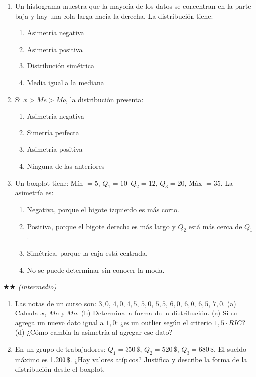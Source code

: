 \documentclass[11pt, letterpaper]{article}
\begin{document}
\begin{enumerate}[label=\textbf{\arabic*.}, leftmargin=*]
  \item Un histograma muestra que la mayoría de los datos se concentran en la parte baja y hay una cola larga hacia la derecha. La distribución tiene:
  \begin{enumerate}[label=\Alph*),leftmargin=14pt]
    \item Asimetría negativa
    \item Asimetría positiva
    \item Distribución simétrica
    \item Media igual a la mediana
  \end{enumerate}

  \item Si $\bar{x} > Me > Mo$, la distribución presenta:
  \begin{enumerate}[label=\Alph*),leftmargin=14pt]
    \item Asimetría negativa
    \item Simetría perfecta
    \item Asimetría positiva
    \item Ninguna de las anteriores
  \end{enumerate}

  \item Un boxplot tiene: Mín $= 5$, $Q_1 = 10$, $Q_2 = 12$, $Q_3 = 20$, Máx $= 35$. La asimetría es:
  \begin{enumerate}[label=\Alph*),leftmargin=14pt]
    \item Negativa, porque el bigote izquierdo es más corto.
    \item Positiva, porque el bigote derecho es más largo y $Q_2$ está más cerca de $Q_1$.
    \item Simétrica, porque la caja está centrada.
    \item No se puede determinar sin conocer la moda.
  \end{enumerate}
\end{enumerate}

$\bigstar\bigstar$ \textit{(intermedio)}

\begin{enumerate}[label=\textbf{\arabic*.}, leftmargin=*, resume]
  \item Las notas de un curso son: $3{,}0$, $4{,}0$, $4{,}5$, $5{,}0$, $5{,}5$, $6{,}0$, $6{,}0$, $6{,}5$, $7{,}0$.
  (a) Calcula $\bar{x}$, $Me$ y $Mo$.
  (b) Determina la forma de la distribución.
  (c) Si se agrega un nuevo dato igual a $1{,}0$: ¿es un outlier según el criterio $1{,}5 \cdot RIC$?
  (d) ¿Cómo cambia la asimetría al agregar ese dato?
  \vspace{2.8cm}

  \item En un grupo de trabajadores: $Q_1 = 350\,\$$, $Q_2 = 520\,\$$, $Q_3 = 680\,\$$. El sueldo máximo es 1.200\,\$. ¿Hay valores atípicos? Justifica y describe la forma de la distribución desde el boxplot.
\end{enumerate}
\end{document}
